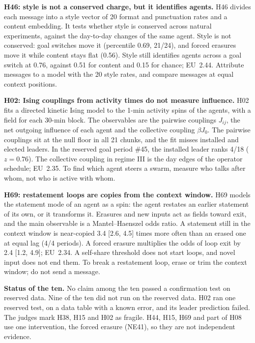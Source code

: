 \textbf{H46: style is not a conserved charge, but it identifies agents.}
H46 divides each message into a style vector of 20 format and punctuation rates and a content embedding. It tests whether style is conserved across natural experiments, against the day-to-day changes of the same agent. Style is not conserved: goal switches move it (percentile 0.69, 21/24), and forced erasures move it while content stays flat (0.56). Style still identifies agents across a goal switch at 0.76, against 0.51 for content and 0.15 for chance; EU~2.44. Attribute messages to a model with the 20 style rates, and compare messages at equal context positions.

\textbf{H02: Ising couplings from activity times do not measure influence.}
H02 fits a directed kinetic Ising model to the 1-min activity spins of the agents, with a field for each 30-min block. The observables are the pairwise couplings $J_{ij}$, the net outgoing influence of each agent and the collective coupling $\beta J_0$. The pairwise couplings sit at the null floor in all 21 chunks, and the fit misses installed and elected leaders. In the reserved goal period \#45, the installed leader ranks 4/18 ($z=0.76$). The collective coupling in regime III is the day edges of the operator schedule; EU~2.35. To find which agent steers a swarm, measure who talks after whom, not who is active with whom.

\textbf{H69: restatement loops are copies from the context window.}
H69 models the statement mode of an agent as a spin: the agent restates an earlier statement of its own, or it transforms it. Erasures and new inputs act as fields toward exit, and the main observable is a Mantel--Haenszel odds ratio. A statement still in the context window is near-copied 3.4 [2.6, 4.5] times more often than an erased one at equal lag (4/4 periods). A forced erasure multiplies the odds of loop exit by 2.4 [1.2, 4.9]; EU~2.34. A self-share threshold does not start loops, and novel input does not end them. To break a restatement loop, erase or trim the context window; do not send a message.

\textbf{Status of the ten.} No claim among the ten passed a confirmation test on reserved data. Nine of the ten did not run on the reserved data. H02 ran one reserved test, on a data table with a known error, and its leader prediction failed. The judges mark H38, H15 and H02 as fragile. H44, H15, H69 and part of H08 use one intervention, the forced erasure (NE41), so they are not independent evidence.
